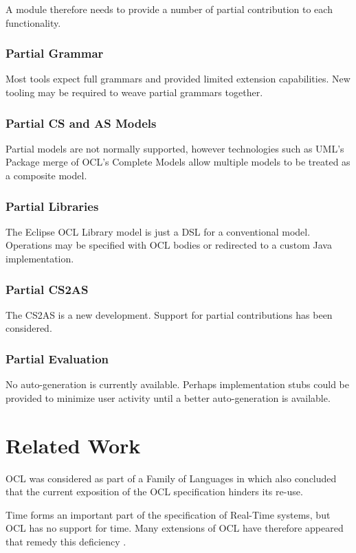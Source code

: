 \documentclass{llncs}
\begin{document}
A module therefore needs to provide a number of partial contribution to each functionality. 

\subsubsection{Partial Grammar}
Most tools expect full grammars and provided limited extension capabilities. New tooling may be required to weave partial grammars together.

\subsubsection{Partial CS and AS Models}
Partial models are not normally supported, however technologies such as UML's Package merge of OCL's Complete Models allow multiple models to be treated as a composite model.

\subsubsection{Partial Libraries}
The Eclipse OCL Library model is just a DSL for a conventional model. Operations may be specified with OCL bodies or redirected to a custom Java implementation.

\subsubsection{Partial CS2AS}
The CS2AS is a new development. Support for partial contributions has been considered.

\subsubsection{Partial Evaluation}
No auto-generation is currently available. Perhaps implementation stubs could be provided to minimize user activity until a better auto-generation is available.

\section{Related Work}\label{Related Work}

OCL was considered as part of a Family of Languages in \cite{OCLFamily} which also concluded that the current exposition of the OCL specification hinders its re-use.

Time forms an important part of the specification of Real-Time systems, but OCL has no support for time. Many extensions of OCL have therefore appeared that remedy this deficiency \cite{TemporalOCL3}\cite{TemporalOCL1}\cite{TemporalOCL4}\cite{TemporalOCL2}.
\end{document}
